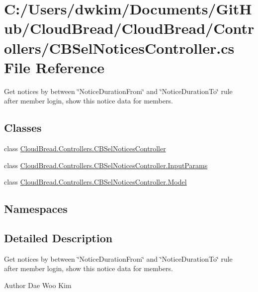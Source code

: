 \hypertarget{a00225}{}\section{C\+:/\+Users/dwkim/\+Documents/\+Git\+Hub/\+Cloud\+Bread/\+Cloud\+Bread/\+Controllers/\+C\+B\+Sel\+Notices\+Controller.cs File Reference}
\label{a00225}


Get notices by between \char`\"{}\+Notice\+Duration\+From\char`\"{} and \char`\"{}\+Notice\+Duration\+To\char`\"{} rule ~\newline
after member login, show this notice data for members.  


\subsection*{Classes}
\begin{DoxyCompactItemize}
\item 
class \hyperlink{a00054}{Cloud\+Bread.\+Controllers.\+C\+B\+Sel\+Notices\+Controller}
\item 
class \hyperlink{a00100}{Cloud\+Bread.\+Controllers.\+C\+B\+Sel\+Notices\+Controller.\+Input\+Params}
\item 
class \hyperlink{a00165}{Cloud\+Bread.\+Controllers.\+C\+B\+Sel\+Notices\+Controller.\+Model}
\end{DoxyCompactItemize}
\subsection*{Namespaces}
\begin{DoxyCompactItemize}
\end{DoxyCompactItemize}


\subsection{Detailed Description}
Get notices by between \char`\"{}\+Notice\+Duration\+From\char`\"{} and \char`\"{}\+Notice\+Duration\+To\char`\"{} rule ~\newline
after member login, show this notice data for members. 

\begin{DoxyAuthor}{Author}
Dae Woo Kim 
\end{DoxyAuthor}

